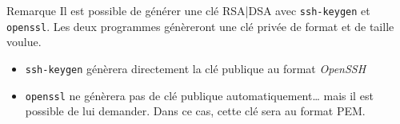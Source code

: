 \documentclass[a4paper,11pt]{article}
\begin{document}
\begin{coltbox}{Remarque}	
	Il est possible de générer une clé RSA|DSA avec \texttt{ssh-keygen} et
	\texttt{openssl}. Les deux programmes génèreront une clé privée de format et
	de taille voulue.

	\begin{itemize}
		\item \texttt{ssh-keygen} génèrera directement la clé publique au
			format \textit{OpenSSH}
		\item \texttt{openssl} ne génèrera pas de clé publique
			automatiquement… mais il est possible de lui demander. Dans ce
			cas, cette clé sera au format PEM.
	\end{itemize}
\end{coltbox}
\vspace{1cm}
\end{document}
